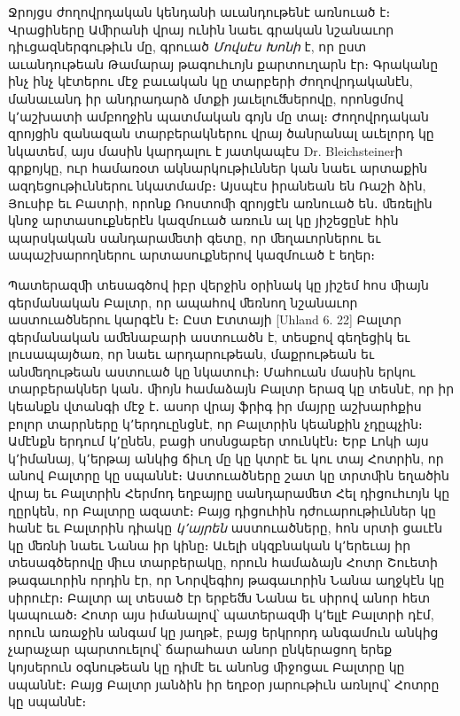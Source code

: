 \documentclass{article}
\begin{document}
{Ջրոյցս ժողովրդական կենդանի աւանդութենէ առնուած է։ Վրացիները Աﬕրանի վրայ ունին նաեւ գրական նշանաւոր դիւցազներգութիւն մը, գրուած \emph{Մովսէս Խոնի} է, որ ըստ աւանդութեան Թամարայ թագուհւոյն քարտուղարն էր։ Գրականը ինչ ինչ կէտերու մէջ բաւական կը տարբերի ժողովրդականէն, մանաւանդ իր անդրադարձ մտքի յաւելուﬓերովը, որոնցմով կ՚աշխատի ամբողջին պատմական գոյն մը տալ։ Ժողովրդական զրոյցին զանազան տարբերակներու վրայ ծանրանալ աւելորդ կը նկատեմ, այս մասին կարդալու է յատկապէս Dr. Bleichsteinerի գրքոյկը, ուր համառօտ ակնարկութիւններ կան նաեւ արտաքին ազդեցութիւններու նկատմամբ։ Այսպէս իրանեան են Ռաշի ձին, Յուսիբ եւ Բատրի, որոնք Ռոստոﬕ զրոյցէն առնուած են․ ﬔռելին կնոջ արտասուքներէն կազմուած առուն ալ կը յիշեցընէ հին պարսկական սանդարաﬔտի գետը, որ ﬔղաւորներու եւ ապաշխարողներու արտասուքներով կազմուած է եղեր։

Պատերազﬕ տեսագծով իբր վերջին օրինակ կը յիշեմ հոս ﬕայն գերմանական Բալտր, որ ապահով ﬔռնող նշանաւոր աստուածներու կարգէն է։ Ըստ Էտտայի [Uhland 6. 22] Բալտր գերմանական աﬔնաբարի աստուածն է, տեսքով գեղեցիկ եւ լուսապայծառ, որ նաեւ արդարութեան, մաքրութեան եւ անﬔղութեան աստուած կը նկատուի։ Մահուան մասին երկու տարբերակներ կան․ ﬕոյն համաձայն Բալտր երազ կը տեսնէ, որ իր կեանքն վտանգի մէջ է․ ասոր վրայ ֆրիգ իր մայրը աշխարհքիս բոլոր տարրները կ՚երդուընցնէ, որ Բալտրին կեանքին չդըպչին։ Ամէնքն երդում կ՚ընեն, բացի սոսնցաբեր տունկէն։ Երբ Լոկի այս կ՚իմանայ, կ՚երթայ անկից ճիւղ մը կը կտրէ եւ կու տայ Հոտրին, որ անով Բալտրը կը սպաննէ։ Աստուածները շատ կը տրտﬕն եղածին վրայ եւ Բալտրին Հերմոդ եղբայրը սանդարաﬔտ Հել դիցուհւոյն կը ղըրկեն, որ Բալտրը ազատէ։ Բայց դիցուհին դժուարութիւններ կը հանէ եւ Բալտրին դիակը \emph{կ՚այրեն} աստուածները, հոն սրտի ցաւէն կը ﬔռնի նաեւ Նանա իր կինը։ Աւելի սկզբնական կ՚երեւայ իր տեսագծերովը ﬕւս տարբերակը, որուն համաձայն Հոտր Շուետի թագաւորին որդին էր, որ Նորվեգիոյ թագաւորին Նանա աղջկէն կը սիրուէր։ Բալտր ալ տեսած էր երբեﬓ Նանա եւ սիրով անոր հետ կապուած։ Հոտր այս իմանալով՝ պատերազﬕ կ՚ելլէ Բալտրի դէմ, որուն առաջին անգամ կը յաղթէ, բայց երկրորդ անգամուն անկից չարաչար պարտուելով՝ ճարահատ անոր ընկերացող երեք կոյսերուն օգնութեան կը դիմէ եւ անոնց ﬕջոցաւ Բալտրը կը սպաննէ։ Բայց Բալտր յանձին իր եղբօր յարութիւն առնլով՝ Հոտրը կը սպաննէ։}
\clearpage
\subsection{}
\end{document}
